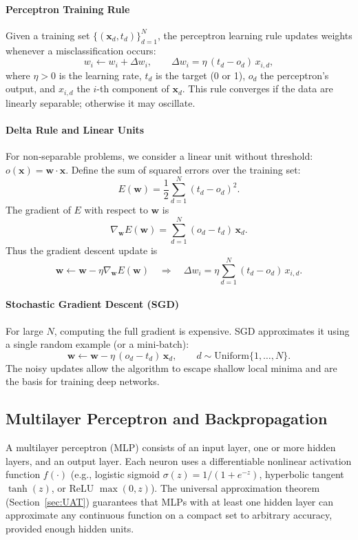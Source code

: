 \documentclass{tufte-handout}
\begin{document}
\paragraph{Perceptron Training Rule}

Given a training set $\{(\mathbf{x}_d, t_d)\}_{d=1}^N$, the perceptron learning rule updates weights whenever a misclassification occurs:
\[
w_i \leftarrow w_i + \Delta w_i,\qquad \Delta w_i = \eta\, (t_d - o_d)\, x_{i,d},
\]
where $\eta > 0$ is the learning rate, $t_d$ is the target (0 or 1), $o_d$ the perceptron's output, and $x_{i,d}$ the $i$-th component of $\mathbf{x}_d$. This rule converges if the data are linearly separable; otherwise it may oscillate.

\paragraph{Delta Rule and Linear Units}

For non‑separable problems, we consider a linear unit without threshold: $o(\mathbf{x}) = \mathbf{w} \cdot \mathbf{x}$. Define the sum of squared errors over the training set:
\[
E(\mathbf{w}) = \frac{1}{2} \sum_{d=1}^{N} (t_d - o_d)^2.
\]
The gradient of $E$ with respect to $\mathbf{w}$ is
\[
\nabla_{\mathbf{w}} E(\mathbf{w}) = \sum_{d=1}^{N} (o_d - t_d)\,\mathbf{x}_d.
\]
Thus the gradient descent update is
\[
\mathbf{w} \leftarrow \mathbf{w} - \eta \nabla_{\mathbf{w}} E(\mathbf{w})
\quad\Longrightarrow\quad
\Delta w_i = \eta \sum_{d=1}^{N} (t_d - o_d)\, x_{i,d}.
\]

\paragraph{Stochastic Gradient Descent (SGD)}

For large $N$, computing the full gradient is expensive. SGD approximates it using a single random example (or a mini‑batch):
\[
\mathbf{w} \leftarrow \mathbf{w} - \eta\, (o_d - t_d)\,\mathbf{x}_d,\qquad d \sim \text{Uniform}\{1,\dots,N\}.
\]
The noisy updates allow the algorithm to escape shallow local minima and are the basis for training deep networks.

\subsection{Multilayer Perceptron and Backpropagation}

A multilayer perceptron (MLP) consists of an input layer, one or more hidden layers, and an output layer. Each neuron uses a differentiable nonlinear activation function $f(\cdot)$ (e.g., logistic sigmoid $\sigma(z) = 1/(1+e^{-z})$, hyperbolic tangent $\tanh(z)$, or ReLU $\max(0,z)$). The universal approximation theorem (Section~\ref{sec:UAT}) guarantees that MLPs with at least one hidden layer can approximate any continuous function on a compact set to arbitrary accuracy, provided enough hidden units.
\end{document}
